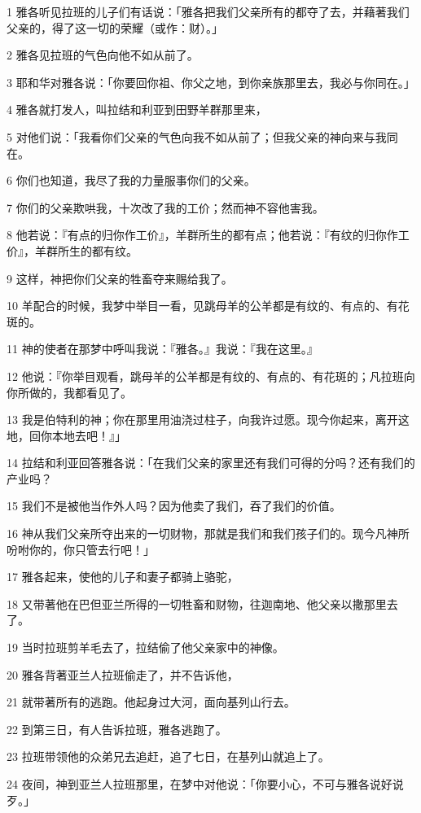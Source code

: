 \par 1 雅各听见拉班的儿子们有话说：「雅各把我们父亲所有的都夺了去，并藉著我们父亲的，得了这一切的荣耀（或作：财）。」
\par 2 雅各见拉班的气色向他不如从前了。
\par 3 耶和华对雅各说：「你要回你祖、你父之地，到你亲族那里去，我必与你同在。」
\par 4 雅各就打发人，叫拉结和利亚到田野羊群那里来，
\par 5 对他们说：「我看你们父亲的气色向我不如从前了；但我父亲的神向来与我同在。
\par 6 你们也知道，我尽了我的力量服事你们的父亲。
\par 7 你们的父亲欺哄我，十次改了我的工价；然而神不容他害我。
\par 8 他若说：『有点的归你作工价』，羊群所生的都有点；他若说：『有纹的归你作工价』，羊群所生的都有纹。
\par 9 这样，神把你们父亲的牲畜夺来赐给我了。
\par 10 羊配合的时候，我梦中举目一看，见跳母羊的公羊都是有纹的、有点的、有花斑的。
\par 11 神的使者在那梦中呼叫我说：『雅各。』我说：『我在这里。』
\par 12 他说：『你举目观看，跳母羊的公羊都是有纹的、有点的、有花斑的；凡拉班向你所做的，我都看见了。
\par 13 我是伯特利的神；你在那里用油浇过柱子，向我许过愿。现今你起来，离开这地，回你本地去吧！』」
\par 14 拉结和利亚回答雅各说：「在我们父亲的家里还有我们可得的分吗？还有我们的产业吗？
\par 15 我们不是被他当作外人吗？因为他卖了我们，吞了我们的价值。
\par 16 神从我们父亲所夺出来的一切财物，那就是我们和我们孩子们的。现今凡神所吩咐你的，你只管去行吧！」
\par 17 雅各起来，使他的儿子和妻子都骑上骆驼，
\par 18 又带著他在巴但亚兰所得的一切牲畜和财物，往迦南地、他父亲以撒那里去了。
\par 19 当时拉班剪羊毛去了，拉结偷了他父亲家中的神像。
\par 20 雅各背著亚兰人拉班偷走了，并不告诉他，
\par 21 就带著所有的逃跑。他起身过大河，面向基列山行去。
\par 22 到第三日，有人告诉拉班，雅各逃跑了。
\par 23 拉班带领他的众弟兄去追赶，追了七日，在基列山就追上了。
\par 24 夜间，神到亚兰人拉班那里，在梦中对他说：「你要小心，不可与雅各说好说歹。」
